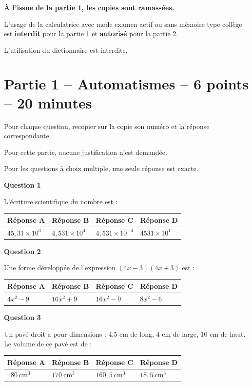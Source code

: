\documentclass[11pt]{article}
\newcommand{\titreexo}[1]{\par\noindent\textbf{#1}\par\vspace{0.2em}}
\newenvironment{qcm}{%
\begin{center}\renewcommand\arraystretch{1.4}
\begin{tabular}{|>{\centering\arraybackslash}p{3.2cm}|>{\centering\arraybackslash}p{3.2cm}|>{\centering\arraybackslash}p{3.2cm}|>{\centering\arraybackslash}p{3.2cm}|}
\hline
}{%
\\ \hline
\end{tabular}
\renewcommand\arraystretch{1}
\end{center}
}
\begin{document}
\begin{center}
\textbf{À l'issue de la partie 1, les copies sont ramassées.}
\end{center}

\medskip

L'usage de la calculatrice avec mode examen actif ou sans mémoire \og type collège \fg est \textbf{interdit} pour la partie 1 et \textbf{autorisé} pour la partie 2.

L'utilisation du dictionnaire est interdite.

\bigskip

\section*{Partie 1 – Automatismes – 6 points – 20 minutes}

Pour chaque question, recopier sur la copie son numéro et la réponse correspondante.

Pour cette partie, aucune justification n'est demandée.

Pour les questions à choix multiple, une seule réponse est exacte.

\titreexo{Question 1}
L'écriture scientifique du nombre  est :

\begin{qcm}
\textbf{Réponse A} & \textbf{Réponse B} & \textbf{Réponse C} & \textbf{Réponse D} \\
\hline
$45,31 \times 10^{3}$ & $4,531 \times 10^{4}$ & $4,531 \times 10^{-4}$ & $4531 \times 10^{1}$
\end{qcm}

\titreexo{Question 2}
Une forme développée de l'expression $(4x-3)(4x+3)$ est :

\begin{qcm}
\textbf{Réponse A} & \textbf{Réponse B} & \textbf{Réponse C} & \textbf{Réponse D} \\
\hline
$4x^2 - 9$ & $16x^2+9$ & $16x^2-9$ & $8x^2-6$
\end{qcm}

\titreexo{Question 3}
Un pavé droit a pour dimensions : 4,5 cm de long, 4 cm de large, 10 cm de haut. Le volume de ce pavé est de :

\begin{qcm}
\textbf{Réponse A} & \textbf{Réponse B} & \textbf{Réponse C} & \textbf{Réponse D} \\
\hline
$180~\text{cm}^3$ & $170~\text{cm}^3$ & $160,5~\text{cm}^3$ & $18,5~\text{cm}^3$
\end{qcm}
\end{document}
